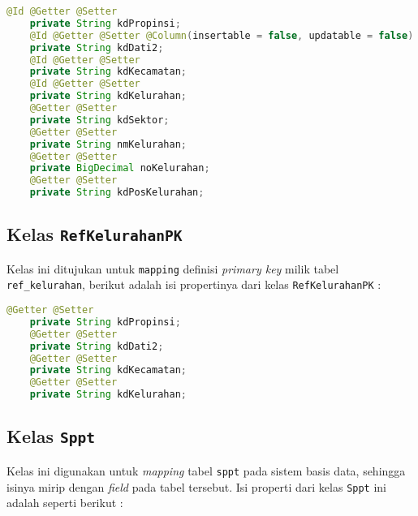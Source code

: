 \documentclass[pdftex,12pt, oneside]{article}
\begin{document}
\begin{lstlisting}[language=java]
    @Id @Getter @Setter
    private String kdPropinsi;
    @Id @Getter @Setter @Column(insertable = false, updatable = false)
    private String kdDati2;
    @Id @Getter @Setter
    private String kdKecamatan;
    @Id @Getter @Setter
    private String kdKelurahan;
    @Getter @Setter
    private String kdSektor;
    @Getter @Setter
    private String nmKelurahan;
    @Getter @Setter
    private BigDecimal noKelurahan;
    @Getter @Setter
    private String kdPosKelurahan;
\end{lstlisting}

\subsection{Kelas \texttt{RefKelurahanPK}}

Kelas ini ditujukan untuk \texttt{mapping} definisi \textit{primary key} milik tabel \texttt{ref\_kelurahan}, berikut adalah isi propertinya dari kelas \texttt{RefKelurahanPK} :

\begin{lstlisting}[language=java]
    @Getter @Setter
    private String kdPropinsi;
    @Getter @Setter
    private String kdDati2;
    @Getter @Setter
    private String kdKecamatan;
    @Getter @Setter
    private String kdKelurahan;
\end{lstlisting}

\subsection{Kelas \texttt{Sppt}}

Kelas ini digunakan untuk \textit{mapping} tabel \texttt{sppt} pada sistem basis data, sehingga isinya mirip dengan \textit{field} pada tabel tersebut. Isi properti dari kelas \texttt{Sppt} ini adalah seperti berikut :
\end{document}
